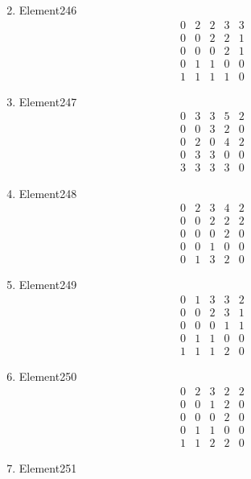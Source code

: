 \documentclass[12pt]{article}
\begin{document}
\begin{multicols}{3}
\begin{enumerate}
\begin{equation*}
\end{equation*}
\item Element246
\begin{equation*}
\begin{array}{ccccc}
0&2&2&3&3\\
0&0&2&2&1\\
0&0&0&2&1\\
0&1&1&0&0\\
1&1&1&1&0
\end{array}
\end{equation*}
\item Element247
\begin{equation*}
\begin{array}{ccccc}
0&3&3&5&2\\
0&0&3&2&0\\
0&2&0&4&2\\
0&3&3&0&0\\
3&3&3&3&0
\end{array}
\end{equation*}
\item Element248
\begin{equation*}
\begin{array}{ccccc}
0&2&3&4&2\\
0&0&2&2&2\\
0&0&0&2&0\\
0&0&1&0&0\\
0&1&3&2&0
\end{array}
\end{equation*}
\item Element249
\begin{equation*}
\begin{array}{ccccc}
0&1&3&3&2\\
0&0&2&3&1\\
0&0&0&1&1\\
0&1&1&0&0\\
1&1&1&2&0
\end{array}
\end{equation*}
\item Element250
\begin{equation*}
\begin{array}{ccccc}
0&2&3&2&2\\
0&0&1&2&0\\
0&0&0&2&0\\
0&1&1&0&0\\
1&1&2&2&0
\end{array}
\end{equation*}
\item Element251

\end{enumerate}
\end{multicols}
\end{document}
